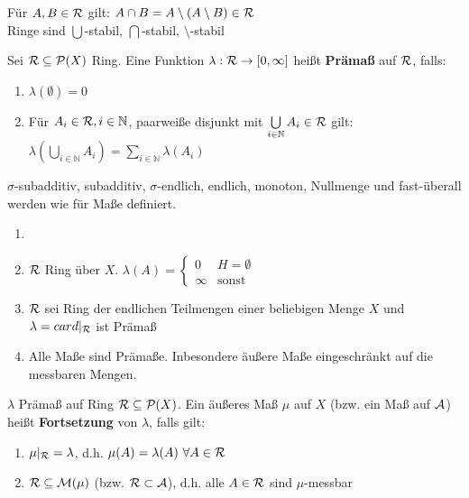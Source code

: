   \begin{remark}
    Für $A,B \in \mathcal{R}$ gilt: $A \cap B = A \setminus (A \setminus B) \in \mathcal{R}$\\
    Ringe sind $\bigcup$-stabil, $\bigcap$-stabil, $\setminus$-stabil
  \end{remark}

  \begin{definition}[Im Aufschrieb II.10]
    Sei $\mathcal{R} \subseteq \mathcal{P}(X)$ Ring. Eine Funktion $\lambda: \mathcal{R} \to [0, \infty]$ heißt \textbf{Prämaß} auf $\mathcal{R}$, falls:
    \begin{enumerate}[label=\roman*)]
      \item $\lambda(\emptyset) = 0$
      \item Für $A_i \in \mathcal{R}, i \in \mathbb{N}$, paarweiße disjunkt mit $\bigcup\limits_{i \in \mathbb{N}} A_i \in \mathcal{R}$ gilt:\\
      $\lambda(\bigcup\limits_{i \in \mathbb{N}} A_i) = \sum\limits_{i \in \mathbb{N}} \lambda(A_i) $
    \end{enumerate}
  \end{definition}

  \begin{remark}
    $\sigma$-subadditiv, subadditiv, $\sigma$-endlich, endlich, monoton, Nullmenge und fast-überall werden wie für Maße definiert. 
  \end{remark}

  \begin{example}
    \begin{enumerate}[label=\roman*)]
      \item[]
      \item $\mathcal{R}$ Ring über $X$. $\lambda(A) = \begin{cases}
              0 & H = \emptyset\\
              \infty & \text{sonst}
            \end{cases}$
      \item $\mathcal{R}$ sei Ring der endlichen Teilmengen einer beliebigen Menge $X$ und $\lambda = card|_{\mathcal{R}}$ ist Prämaß
      \item Alle Maße sind Prämaße. Inbesondere äußere Maße eingeschränkt auf die messbaren Mengen.
    \end{enumerate}
  \end{example}

  \begin{definition}[Im Aufschrieb II.11]
    $\lambda$ Prämaß auf Ring $\mathcal{R} \subseteq \mathcal{P}(X)$. Ein äußeres Maß $\mu$ auf $X$ (bzw. ein Maß auf $\mathcal{A}$) heißt \textbf{Fortsetzung} von $\lambda$, falls gilt:
    \begin{enumerate}[label=\roman*)]
      \item $\mu|_{\mathcal{R}} = \lambda$, d.h. $\mu(A) = \lambda(A) \ \forall A \in \mathcal{R}$
      \item $\mathcal{R} \subseteq \mathcal{M}(\mu)$ (bzw. $\mathcal{R} \subset \mathcal{A}$), d.h. alle $A \in \mathcal{R}$ sind $\mu$-messbar
    \end{enumerate}
  \end{definition}

